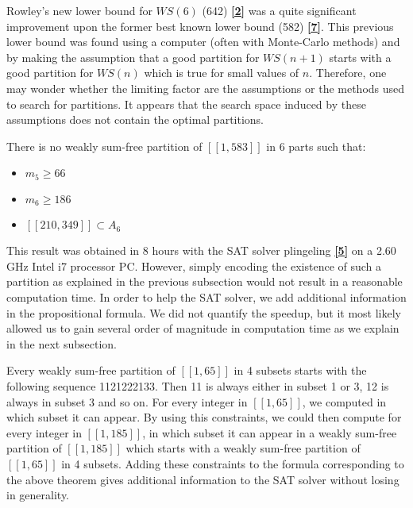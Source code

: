 Rowley's new lower bound for \(WS(6)\) (642)  \hyperlink{label2}{\textbf{[2]}} was a quite significant improvement upon the former
best known lower bound (582) \hyperlink{label7}{\textbf{[7]}}. This previous lower bound was found using a computer (often with Monte-Carlo methods) and by making the
assumption that a good partition for \(WS(n+1)\) starts with a good partition for \(WS(n)\) which is true for small values of \(n\).
Therefore, one may wonder whether the limiting factor are the assumptions or the methods used to search for partitions. It appears that the search space
induced by these assumptions does not contain the optimal partitions.

\begin{computational theorem}
There is no weakly sum-free partition of \([\![1,583]\!]\) in 6 parts such that:
\begin{itemize}
	\item \(m_5 \geqslant 66\)
	\item \(m_6 \geqslant 186\)
	\item \([\![210,349]\!] \subset A_6\)
\end{itemize}
\end{computational theorem}

This result was obtained in 8 hours with the SAT solver plingeling \hyperlink{label5}{\textbf{[5]}} on a 2.60 GHz Intel i7 processor PC.
However, simply encoding the existence of such a partition as explained in the previous subsection would not result in a reasonable
computation time. In order to help the SAT solver, we add additional information in the propositional formula. We did not quantify the
speedup, but it most likely allowed us to gain several order of magnitude in computation time as we explain in the next subsection.

\par
Every weakly sum-free partition of \([\![1,65]\!]\) in 4 subsets starts with the following sequence 1121222133. Then 11 is always
either in subset 1 or 3, 12 is always in subset 3 and so on. For every integer in \([\![1,65]\!]\), we computed in which subset it can appear.
By using this constraints, we could then compute for every integer in \([\![1,185]\!]\), in which subset it can appear in a weakly sum-free
partition of  \([\![1,185]\!]\) which starts with a  weakly sum-free partition of \([\![1,65]\!]\) in 4 subsets. Adding these constraints to the
formula corresponding to the above theorem gives additional information to the SAT solver without losing in generality.

